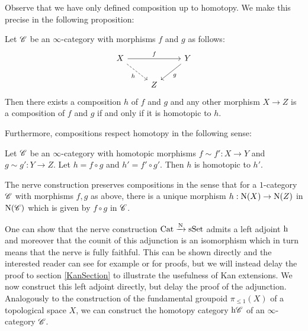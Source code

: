 \documentclass[../../thesis.tex]{subfiles}
\begin{document}
Observe that we have only defined composition up to homotopy.
We make this precise in the following proposition:
\begin{proposition}
    Let $\mathscr{C}$ be an $\infty$-category with morphisms $f$ and $g$ as follows:
    \[\begin{tikzcd}
            X && Y \\
            & Z
            \arrow["f", from=1-1, to=1-3]
            \arrow["g", from=1-3, to=2-2]
            \arrow["h"', dashed, from=1-1, to=2-2]
        \end{tikzcd}\]
    Then there exists a composition $h$ of $f$ and $g$ and any other morphism $X\to Z$ is a composition of $f$ and $g$ if and only if it is homotopic to $h$.
\end{proposition}
Furthermore, compositions respect homotopy in the following sense:
\begin{proposition}
    Let $\mathscr{C}$ be an $\infty$-category with homotopic morphisms $f \sim f':X \to Y$ and $g \sim g': Y \to Z$.
    Let $h=f\circ g$ and $h' = f' \circ g'$.
    Then $h$ is homotopic to $h'$.
\end{proposition}
\begin{remark}
    The nerve construction preserves compositions in the sense that for a $1$-category $\mathscr{C}$ with morphisms $f,g$ as above, there is a unique morphism $h:\mathrm{N}(X)\to \mathrm{N}(Z)$ in $\mathrm{N}(\mathscr{C})$ which is given by $f\circ g$ in $\mathscr{C}$.
\end{remark}
One can show that the nerve construction $\mathrm{Cat} \xrightarrow{\mathrm{N}} \mathrm{sSet}$ admits a left adjoint $\mathrm{h}$ and moreover that the counit of this adjunction is an isomorphism which in turn means that the nerve is fully faithful.
This can be shown directly and the interested reader can see for example \cite[Proposition 4.10.]{Rezk} or \cite[\href{https://kerodon.net/tag/002Y}{Subsection 002Y}]{kerodon} for proofs, but we will instead delay the proof to section \ref{KanSection} to illustrate the usefulness of Kan extensions.
We now construct this left adjoint directly, but delay the proof of the adjunction.
Analogously to the construction of the fundamental groupoid $\pi_{\leq 1}(X)$ of a topological space $X$, we can construct the homotopy category $\mathrm{h}\mathscr{C}$ of an $\infty$-category $\mathscr{C}$.
\end{document}
